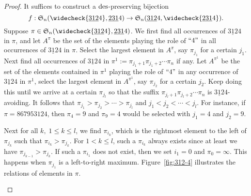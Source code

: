 \begin{proof}
  It suffices to construct a $\mathrm{des}$-preserving bijection 
  $$f: \S_n(\widecheck{\underline{312}4},\underline{231}4) \to \S_n(\underline{312}4,\widecheck{\underline{231}4}).$$
  Suppose $\pi\in \S_n(\widecheck{\underline{312}4},\underline{231}4)$. 
  We first find all occurrences of $\underline{312}4$ in $\pi$, and
  let $A^{\pi}$ be the set of the elements playing the role of $``4"$ in all occurrences of $\underline{312}4$ in $\pi$. Select the largest element in $A^{\pi}$, say $\pi_{j_1}$ for a certain $j_1$.
  Next find all occurrences of $\underline{312}4$ in $\pi^1:=\pi_{j_1+1} \pi_{j_1+2}\cdots \pi_n$ if any. Let $A^{\pi^1}$ be the set of the elements contained in $\pi^1$ playing the role of $``4"$ in any occurrence of $\underline{312}4$ in $\pi^1$, select the largest element in $A^{\pi^1}$, say $\pi_{j_2}$ for a certain $j_2$. Keep doing this until we arrive at a certain $\pi_{j_l}$ so that the suffix $\pi_{j_l+1}\pi_{j_l+2}\cdots \pi_{n}$ is $\underline{312}4$-avoiding. It follows that $\pi_{j_1}>\pi_{j_2}>\cdots>\pi_{j_l}$ and $j_1<j_2<\cdots<j_l$.
  For instance, if $\pi=867953124$, then $\pi_4=9$ and $\pi_9=4$ would be selected with $j_1=4$ and $j_2=9$.

  Next for all $k,\; 1\le k\le l$, we find $\pi_{i_k}$, which is the rightmost element to the left of $\pi_{j_k}$ such that $\pi_{i_k}>\pi_{j_k}$. For $1<k\le l$, such a $\pi_{i_k}$ always exists since at least we have $\pi_{j_{k-1}}>\pi_{j_k}$. If such a $\pi_{i_1}$ does not exist, then we set $i_1=0$ and $\pi_0=\infty$. This happens when $\pi_{j_1}$ is a left-to-right maximum. 
  Figure~\ref{fig:312-4} illustrates the relations of elements in $\pi$. 
  \begin{figure}[ht]
    \centering
\end{figure}
\end{proof}

